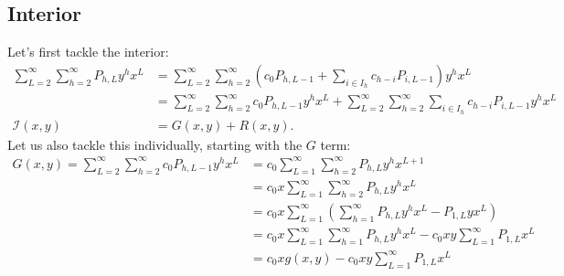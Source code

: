 		\subsection{Interior}
		Let's first tackle the interior:
		\begin{align}
			\sum_{L=2}^\infty\sum_{h=2}^\infty P_{h, L} y^hx^L &= \sum_{L=2}^\infty\sum_{h=2}^\infty \left(c_0P_{h, L - 1} + \sum_{i\in I_h} c_{h-i}P_{i, L-1}\right) y^hx^L\\
			&= \sum_{L=2}^\infty\sum_{h=2}^\infty c_0P_{h, L - 1}y^hx^L + \sum_{L=2}^\infty\sum_{h=2}^\infty\sum_{i\in I_h} c_{h-i}P_{i, L-1}y^hx^L\\
			\mathcal{I}(x, y)&= G(x, y) + R(x, y).
		\end{align}
		Let us also tackle this individually, starting with the $G$ term:
		\begin{align}
			G(x, y) = \sum_{L=2}^\infty\sum_{h=2}^\infty c_0P_{h, L - 1}y^hx^L &= c_0\sum_{L=1}^\infty\sum_{h=2}^\infty P_{h, L}y^hx^{L+1}\\
			&= c_0x\sum_{L=1}^\infty\sum_{h=2}^\infty P_{h, L}y^hx^L\\
			&= c_0x\sum_{L=1}^\infty\left( \sum_{h=1}^\infty P_{h, L}y^hx^L -  P_{1, L}yx^L\right)\\
			&= c_0x\sum_{L=1}^\infty\sum_{h=1}^\infty P_{h, L}y^hx^L -  c_0xy\sum_{L=1}^\infty P_{1, L}x^L\\
			&= c_0xg(x, y) -  c_0xy\sum_{L=1}^\infty P_{1, L}x^L\\
		\end{align}
		
